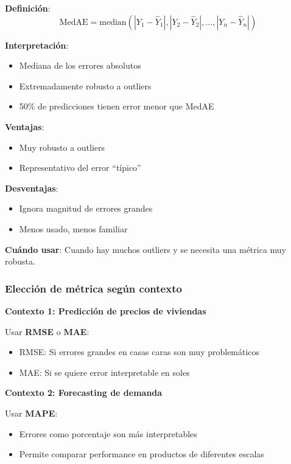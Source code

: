 \documentclass[
  doc,
  floatsintext,
  longtable,
  a4paper,
  nolmodern,
  notxfonts,
  notimes,
  12pt,
  colorlinks=true,linkcolor=blue,citecolor=blue,urlcolor=blue]{apa7}
\providecommand{\tightlist}{%
  \setlength{\itemsep}{0pt}\setlength{\parskip}{0pt}}
\begin{document}
\textbf{Definición}: \[
\text{MedAE} = \text{median}(|Y_1 - \hat{Y}_1|, |Y_2 - \hat{Y}_2|, \ldots, |Y_n - \hat{Y}_n|)
\]

\textbf{Interpretación}:

\begin{itemize}
\tightlist
\item
  Mediana de los errores absolutos
\item
  Extremadamente robusto a outliers
\item
  50\% de predicciones tienen error menor que MedAE
\end{itemize}

\textbf{Ventajas}:

\begin{itemize}
\tightlist
\item
  Muy robusto a outliers
\item
  Representativo del error ``típico''
\end{itemize}

\textbf{Desventajas}:

\begin{itemize}
\tightlist
\item
  Ignora magnitud de errores grandes
\item
  Menos usado, menos familiar
\end{itemize}

\textbf{Cuándo usar}: Cuando hay muchos outliers y se necesita una
métrica muy robusta.

\subsubsection{Elección de métrica según
contexto}\label{elecciuxf3n-de-muxe9trica-seguxfan-contexto}

\textbf{Contexto 1: Predicción de precios de viviendas}

Usar \textbf{RMSE} o \textbf{MAE}:

\begin{itemize}
\tightlist
\item
  RMSE: Si errores grandes en casas caras son muy problemáticos
\item
  MAE: Si se quiere error interpretable en soles
\end{itemize}

\textbf{Contexto 2: Forecasting de demanda}

Usar \textbf{MAPE}:

\begin{itemize}
\tightlist
\item
  Errores como porcentaje son más interpretables
\item
  Permite comparar performance en productos de diferentes escalas
\end{itemize}
\end{document}
